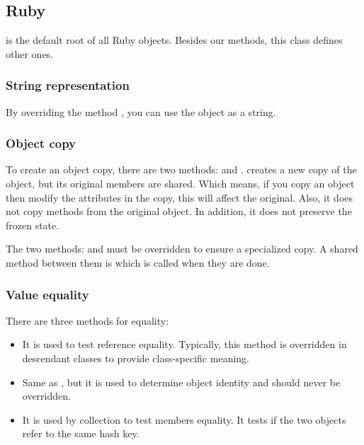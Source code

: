 \documentclass{KodeBook}
\begin{document}
\subsection{Ruby}

 is the default root of all Ruby objects.
Besides our methods, this class defines other ones.

\subsubsection{String representation}

By overriding the method , you can use the object as a string.



\subsubsection{Object copy}

To create an object copy, there are two methods:  and . 
 creates a new copy of the object, but its original members are shared. 
Which means, if you copy an object then modify the attributes in the copy, this will affect the original.
Also, it does not copy methods from the original object.
In addition, it does not preserve the frozen state.

The two methods:  and  must be overridden to ensure a specialized copy.
A shared method between them is  which is called when they are done.



\subsubsection{Value equality}

There are three methods for equality:
\begin{itemize}
	\item \keyword{==} It is used to test reference equality. 
	Typically, this method is overridden in descendant classes to provide class-specific meaning.
	
	\item {} Same as \keyword{==}, but it is used to determine object identity and should never be overridden.
	
	\item {} It is used by  collection to test members equality. 
	It tests if the two objects refer to the same hash key. 
\end{itemize}
\end{document}
